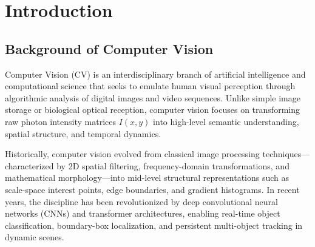 \section{Introduction}

\subsection{Background of Computer Vision}
Computer Vision (CV) is an interdisciplinary branch of artificial intelligence and computational science that seeks to emulate human visual perception through algorithmic analysis of digital images and video sequences. Unlike simple image storage or biological optical reception, computer vision focuses on transforming raw photon intensity matrices $I(x,y)$ into high-level semantic understanding, spatial structure, and temporal dynamics.

Historically, computer vision evolved from classical image processing techniques—characterized by 2D spatial filtering, frequency-domain transformations, and mathematical morphology—into mid-level structural representations such as scale-space interest points, edge boundaries, and gradient histograms. In recent years, the discipline has been revolutionized by deep convolutional neural networks (CNNs) and transformer architectures, enabling real-time object classification, boundary-box localization, and persistent multi-object tracking in dynamic scenes.

